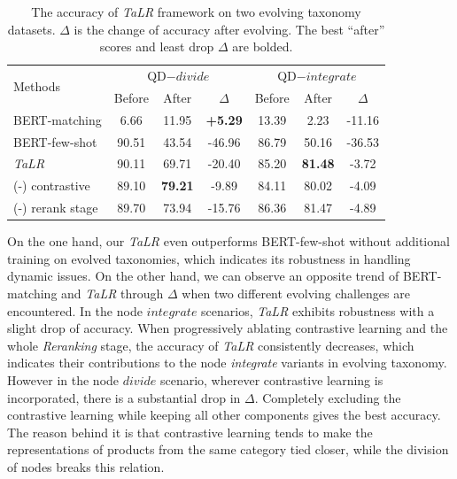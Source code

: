 \begin{table}[th]
\setlength{\tabcolsep}{1.8pt}
  \begin{threeparttable}[b]
  \caption{The accuracy of \textit{TaLR} framework on two evolving taxonomy datasets. $\Delta$ is the change
  of accuracy after evolving. The best ``after'' scores and least drop $\Delta$ are bolded.}
  \label{tb:evolve}
  \centering
  \begin{tabular}{l|ccc|ccc}
    \toprule
    \multirow{2}{*}{Methods} & \multicolumn{3}{c|}{QD$-divide$} & \multicolumn{3}{c}{QD$-integrate$}\\
    \cline{2-7}
    & Before & After & $\Delta$ & Before & After & $\Delta$ \\
    \midrule
    BERT-matching & 6.66 & 11.95 & \textbf{+5.29} & 13.39 & 2.23 & -11.16\\
    BERT-few-shot & 90.51 & 43.54 & -46.96 & 86.79 & 50.16 & -36.53\\
    \midrule
    \textit{TaLR} & 90.11 & 69.71 & -20.40 & 85.20 & \textbf{81.48} & -3.72\\
    (-) contrastive  & 89.10 & \textbf{79.21} & -9.89 & 84.11 & 80.02 & -4.09\\
    (-) rerank stage & 89.70 & 73.94 & -15.76 & 86.36 & 81.47 & -4.89\\
    \bottomrule
  \end{tabular}
  \end{threeparttable}
\end{table}
On the one hand, our \textit{TaLR} even outperforms BERT-few-shot without additional training on evolved taxonomies, which indicates its robustness in handling dynamic issues.
On the other hand, we can observe an opposite trend of BERT-matching and \textit{TaLR} through $\Delta$ when two different evolving challenges are encountered. In the node $integrate$ scenarios, \textit{TaLR} exhibits robustness with a slight drop of accuracy. 
When progressively ablating contrastive learning and the whole \textit{Reranking} stage, the accuracy of \textit{TaLR} consistently decreases, which indicates their contributions to the node \textit{integrate} variants in evolving taxonomy.
However in the node $divide$ scenario, wherever contrastive learning is incorporated, there is a substantial drop in $\Delta$. Completely excluding the contrastive learning while keeping all other components gives the best accuracy. 
The reason behind it is that contrastive learning tends to make the representations of products from the same category tied closer, while the division of nodes breaks this relation. 

